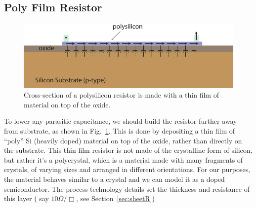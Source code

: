 \subsection{Poly Film Resistor}
\begin{figure}[tb]
\begin{center}
\includegraphics[width=.7\columnwidth]{poly_resistor}
\end{center}
\caption{Cross-section of a polysilicon resistor is made with a thin film of material on top of the oxide.}
\label{fig:mod2-2_ICtech_sld_6}
\end{figure}
To lower any parasitic capacitance, we should build the resistor further away from substrate, as shown in Fig.~\ref{fig:mod2-2_ICtech_sld_6}. This is done by depositing a thin film of “poly” Si (heavily doped) material on top of the oxide, rather than directly on the substrate.  This thin film resistor is not made of the crystalline form of silicon, but rather it's a polycrystal, which is a material made with many fragments of crystals, of varying sizes and arranged in different orientations.   For our purposes, the material behaves similar to a crystal and we can model it as a doped semiconductor.  The process technology details set the thickness and resistance of this layer ( say $10\Omega/\Box$, see Section~\ref{sec:sheetR}) 
